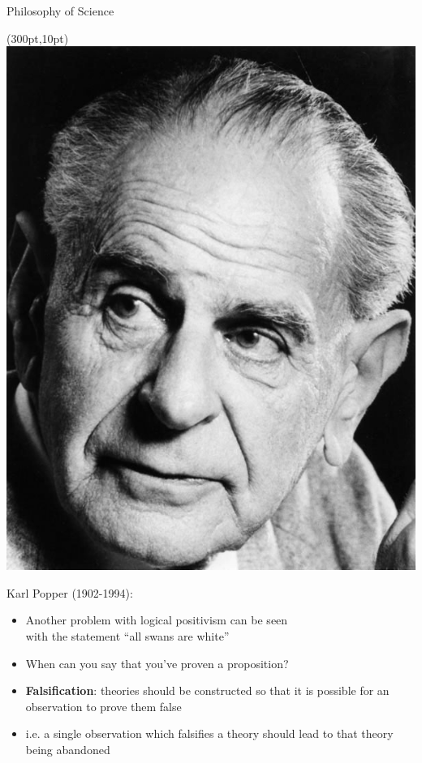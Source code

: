 \documentclass{beamer}
\begin{document}
\begin{frame}{Philosophy of Science}

	\begin{textblock*}{50pt}(300pt,10pt)
		\includegraphics[width=1\textwidth]{../images/Karl_Popper.jpg}
	\end{textblock*}

	Karl Popper (1902-1994):
	\begin{itemize}
		\item<2-> Another problem with logical positivism can be seen \\ with the statement ``all swans are white''
		\item<3-> When can you say that you've proven a proposition?
		\item<4-> \textbf{Falsification}: theories should be constructed so that it is possible for an observation to prove them false
		\item<5->  i.e. a single observation which falsifies a theory should lead to that theory being abandoned
	\end{itemize}


\end{frame}
\end{document}
